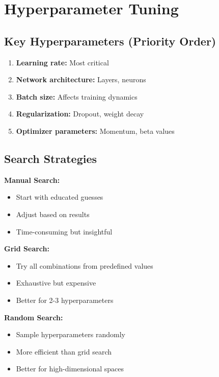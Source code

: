 
\section{Hyperparameter Tuning}
\label{sec:hyperparameter-tuning}

\subsection{Key Hyperparameters (Priority Order)}

\begin{enumerate}
    \item \textbf{Learning rate:} Most critical
    \item \textbf{Network architecture:} Layers, neurons
    \item \textbf{Batch size:} Affects training dynamics
    \item \textbf{Regularization:} Dropout, weight decay
    \item \textbf{Optimizer parameters:} Momentum, beta values
\end{enumerate}

\subsection{Search Strategies}

\textbf{Manual Search:}
\begin{itemize}
    \item Start with educated guesses
    \item Adjust based on results
    \item Time-consuming but insightful
\end{itemize}

\textbf{Grid Search:}
\begin{itemize}
    \item Try all combinations from predefined values
    \item Exhaustive but expensive
    \item Better for 2-3 hyperparameters
\end{itemize}

\textbf{Random Search:}
\begin{itemize}
    \item Sample hyperparameters randomly
    \item More efficient than grid search
    \item Better for high-dimensional spaces
\end{itemize}

